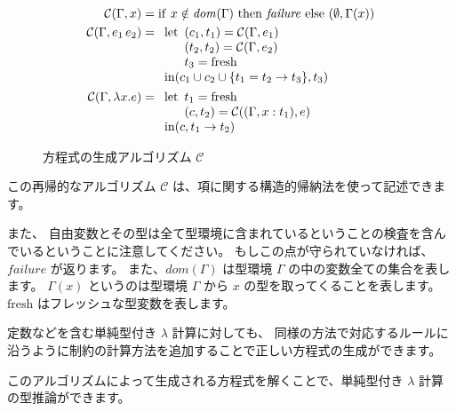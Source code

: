 \begin{figure}[htbp]
  \begin{align*}
    \mathcal{C}(\Gamma, x) &=
      \mathrm{if} ~ x \notin \mathit{dom}(\Gamma) ~
      \mathrm{then} ~ \mathit{failure} ~
      \mathrm{else} ~ (\emptyset, \Gamma(x)) \\
    \mathcal{C}(\Gamma, e_1 \, e_2) &=
    \begin{array}[t]{l}
      \mathrm{let}
        \begin{array}[t]{l}
          (c_1, t_1) = \mathcal{C}(\Gamma, e_1) \\
          (t_2, t_2) = \mathcal{C}(\Gamma, e_2) \\
          t_3 = \mathrm{fresh}
        \end{array} \\
      \mathrm{in} (c_1 \cup c_2 \cup \{t_1 = t_2 \to t_3\}, t_3)
    \end{array} \\
    \mathcal{C}(\Gamma, \lambda x . e) &=
    \begin{array}[t]{l}
      \mathrm{let}
        \begin{array}[t]{l}
          t_1 = \mathrm{fresh} \\
          (c, t_2) = \mathcal{C}((\Gamma, x : t_1), e)
        \end{array} \\
      \mathrm{in} (c, t_1 \to t_2)
    \end{array}
  \end{align*}
  \caption{方程式の生成アルゴリズム $\mathcal C$}
  \label{fig:algorithm-c}
\end{figure}

この再帰的なアルゴリズム $\mathcal C$ は、項に関する構造的帰納法を使って記述できます。

また、
自由変数とその型は全て型環境に含まれているということの検査を含んでいるということに注意してください。
もしこの点が守られていなければ、$\mathit{failure}$ が返ります。
また、$\mathit{dom}(\Gamma)$ は型環境 $\Gamma$ の中の変数全ての集合を表します。
$\Gamma(x)$ というのは型環境 $\Gamma$ から $x$ の型を取ってくることを表します。
$\mathrm{fresh}$ はフレッシュな型変数を表します。

定数などを含む単純型付き $\lambda$ 計算に対しても、
同様の方法で対応するルールに沿うように制約の計算方法を追加することで正しい方程式の生成ができます。

このアルゴリズムによって生成される方程式を解くことで、単純型付き $\lambda$ 計算の型推論ができます。

